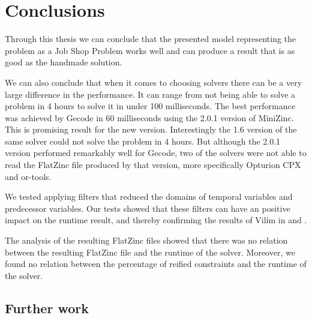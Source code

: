 \chapter{Conclusions} \label{cha:conc}
Through this thesis we can conclude that the presented model representing the problem as a Job Shop Problem works well and can produce a result that is as good as the handmade solution.

We can also conclude that when it comes to choosing solvers there can be a very large difference in the performance. It can range from not being able to solve a problem in 4 hours to solve it in under 100 milliseconds. The best performance was achieved by Gecode in 60 milliseconds using the 2.0.1 version of MiniZinc. This is promising result for the new version. Interestingly the 1.6 version of the same solver could not solve the problem in 4 hours. But although the 2.0.1 version performed remarkably well for Gecode, two of the solvers were not able to read the FlatZinc file produced by that version, more specifically Opturion CPX and or-tools.

We tested applying filters that reduced the domains of temporal variables and predecessor variables. Our tests showed that these filters can have an positive impact on the runtime result, and thereby confirming the results of Vilím in \cite{VilimBartak2002Batch} \cite{Vilim2002Precedence} and \cite{VilimBartak2002Sequence}.

The analysis of the resulting FlatZinc files showed that there was no relation between the resulting FlatZinc file and the runtime of the solver. Moreover, we found no relation between the percentage of reified constraints and the runtime of the solver.

\newpage
\section{Further work}

